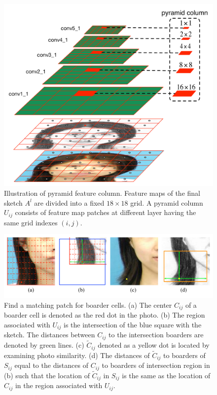 \documentclass[10pt,twocolumn,letterpaper]{article}
\begin{document}
\begin{figure}[htbp]
\centering
\includegraphics[width=0.85\linewidth]{img/pyramidcolumn.pdf}
\caption{Illustration of pyramid feature column. Feature maps of the final sketch $A^{l}$ are divided into a fixed $18\times18$ grid. A pyramid column $U_{ij}$ consists of feature map patches at different layer having the same grid indexes $(i, j)$.}
\label{fig:pyramidcolumn}
\end{figure}

\begin{figure}[htbp]
\centering
\includegraphics[width=0.99\linewidth]{img/border_example.pdf}
\caption{Find a matching patch for boarder cells. (a) The center $C_{ij}$ of a boarder cell is denoted as the red dot in the photo. (b) The region associated with $U_{ij}$ is the intersection of the blue square with the sketch. The distances between $C_{ij}$ to the intersection boarders are denoted by green lines. (c) $\tilde{C}_{ij}$ denoted as a yellow dot is located by examining photo similarity. (d) The distances of $\tilde{C}_{ij}$ to boarders of $S_{ij}$ equal to the distances of  $C_{ij}$ to boarders of intersection region in (b) such that the location of $\tilde{C}_{ij}$ in $S_{ij}$ is the same as the location of $C_{ij}$ in the region associated with $U_{ij}$.}
\label{fig:boarder_example}
\end{figure}
\end{document}
